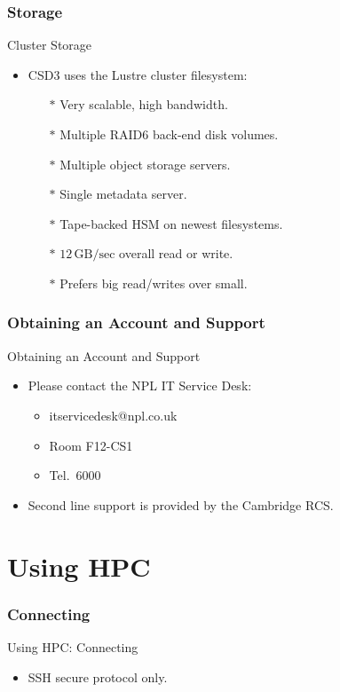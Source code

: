 \section{Storage}
\begin{frame}{Cluster Storage}
  \begin{itemize}
\item{CSD3 uses the Lustre cluster filesystem:}
  \begin{itemize}
\item[$\ast$]{Very scalable, high bandwidth.}
\item[$\ast$]{Multiple RAID6 back-end disk volumes.}
\item[$\ast$]{Multiple object storage servers.}
\item[$\ast$]{Single metadata server.}
\item[$\ast$]{Tape-backed HSM on newest filesystems.}
\item[$\ast$]{\alert{$12\,\text{GB/sec}$ overall read or write.}}
\item[$\ast$]{\alert{Prefers big read/writes over small.}}
\end{itemize}
\end{itemize}
\end{frame}

\section{Obtaining an Account and Support}
\begin{frame}{Obtaining an Account and Support}
\begin{itemize}
\item{Please contact the NPL IT Service Desk:}
  \begin{itemize}
\item{\alert{itservicedesk@npl.co.uk}}
\item{Room F12-CS1}
\item{Tel.~6000}
  \end{itemize}
  \pause
  \item{Second line support is provided by the Cambridge RCS.}
\end{itemize}
\end{frame}

\part{Using HPC}
\frame{\partpage}

\section{Connecting}
\begin{frame}{Using HPC: Connecting}
\begin{itemize}
\item SSH secure protocol only.\hfill\\
\end{itemize}
\end{frame}

